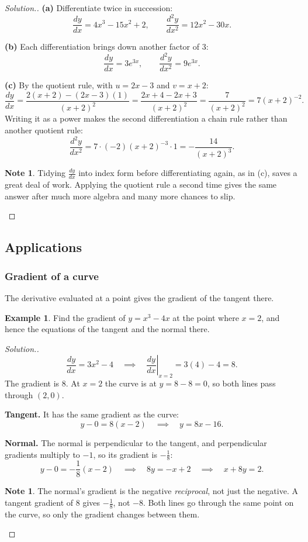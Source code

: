 \documentclass[11pt,a4paper]{article}
\theoremstyle{definition}
\newtheorem{example}[thm]{Example}
\newtheorem{note}[thm]{Note}
\newenvironment{solution}
  {\renewcommand{\qedsymbol}{}\begin{proof}[\textit{Solution}.]}
  {\end{proof}}
\begin{document}
\begin{solution}
\textbf{(a)} Differentiate twice in succession:
$$\frac{dy}{dx}=4x^3-15x^2+2,\qquad \frac{d^2y}{dx^2}=12x^2-30x.$$

\textbf{(b)} Each differentiation brings down another factor of $3$:
$$\frac{dy}{dx}=3e^{3x},\qquad \frac{d^2y}{dx^2}=9e^{3x}.$$

\textbf{(c)} By the quotient rule, with $u=2x-3$ and $v=x+2$:
$$\frac{dy}{dx}=\frac{2(x+2)-(2x-3)(1)}{(x+2)^2}=\frac{2x+4-2x+3}{(x+2)^2}
=\frac{7}{(x+2)^2}=7(x+2)^{-2}.$$
Writing it as a power makes the second differentiation a chain rule rather than another
quotient rule:
$$\frac{d^2y}{dx^2}=7\cdot(-2)(x+2)^{-3}\cdot 1=-\frac{14}{(x+2)^3}.$$

\begin{note}
Tidying $\frac{dy}{dx}$ into index form before differentiating again, as in (c), saves a
great deal of work. Applying the quotient rule a second time gives the same answer after
much more algebra and many more chances to slip.
\end{note}
\end{solution}

\subsection{Applications}

\subsubsection{Gradient of a curve}

The derivative evaluated at a point gives the gradient of the tangent there.

\begin{example}
Find the gradient of $y=x^3-4x$ at the point where $x=2$, and hence the equations of the
tangent and the normal there.
\end{example}

\begin{solution}
$$\frac{dy}{dx}=3x^2-4\quad\implies\quad \left.\frac{dy}{dx}\right|_{x=2}=3(4)-4=8.$$
The gradient is $8$. At $x=2$ the curve is at $y=8-8=0$, so both lines pass through
$(2,0)$.

\textbf{Tangent.} It has the same gradient as the curve:
$$y-0=8(x-2)\quad\implies\quad y=8x-16.$$

\textbf{Normal.} The normal is perpendicular to the tangent, and perpendicular
gradients multiply to $-1$, so its gradient is $-\frac{1}{8}$:
$$y-0=-\frac{1}{8}(x-2)\quad\implies\quad 8y=-x+2\quad\implies\quad x+8y=2.$$

\begin{note}
The normal's gradient is the negative \emph{reciprocal}, not just the negative. A
tangent gradient of $8$ gives $-\frac{1}{8}$, not $-8$. Both lines go through the same
point on the curve, so only the gradient changes between them.
\end{note}
\end{solution}
\end{document}
